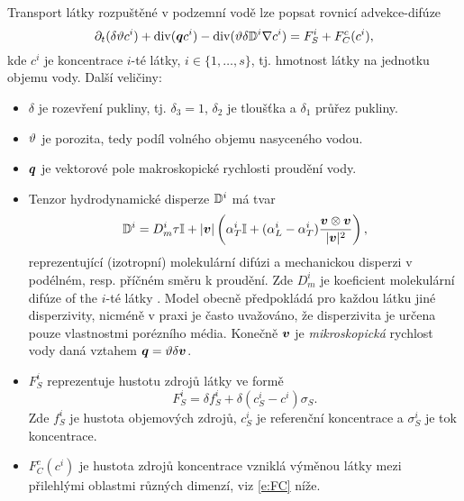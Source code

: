 Transport látky rozpuštěné v podzemní vodě lze popsat rovnicí advekce-difúze
\begin{equation}
    \label{e:ADE}
   \partial_t ( \delta \th c^i) + \div ( \vc q c^i ) - \div (\th \delta \D^i \grad c^i ) = F_S^i + F^c_C(c^i), %
\end{equation}
kde $c^i$  je koncentrace $i$-té látky, $i\in\{1,\dots, s\}$, tj. hmotnost látky na jednotku objemu vody.
Další veličiny:
\begin{itemize}
\item $\delta$  je rozevření pukliny, tj. $\delta_3=1$, $\delta_2$ je tloušťka a $\delta_1$ průřez pukliny.
\item $\vartheta$ \units{}{}{} je porozita, tedy podíl volného objemu nasyceného vodou.
\item $\mathbf{\boldsymbol{q}}$ je vektorové pole makroskopické rychlosti proudění vody.
\item Tenzor hydrodynamické disperze ${{\mathbb{D}}}^i$  má tvar
\begin{equation} 
  \label{eqn:transport_disp}
  {{\mathbb{D}}}^i =D_m^i \tau {\mathbb{I}} + \lvert\mathbf{\boldsymbol{v}}\rvert\left(\alpha_T^i {\mathbb{I}} + (\alpha_L^i - \alpha_T^i) \frac{\mathbf{\boldsymbol{v}} \otimes \mathbf{\boldsymbol{v}}}{\lvert\mathbf{\boldsymbol{v}}\rvert^2}\right),
\end{equation}
reprezentující (izotropní) molekulární difúzi a mechanickou disperzi v podélném, resp. příčném směru k proudění.
Zde $D_m^i$  je koeficient molekulární difúze of the $i$-té látky%
.
Model obecně předpokládá pro každou látku jiné disperzivity, nicméně v praxi je často uvažováno, že disperzivita je určena pouze vlastnostmi porézního média.
Konečně $\mathbf{\boldsymbol{v}}$  je \emph{mikroskopická} rychlost vody daná vztahem $\mathbf{\boldsymbol{q}} = \vartheta\delta\mathbf{\boldsymbol{v}}$.

\item $F_S^i$  reprezentuje hustotu zdrojů látky ve formě
\begin{equation}
 F_S^i = \delta f^i_S + \delta(c_S^i-c^i)\sigma_S. \label{eqn:transport_sources}
\end{equation}
Zde $f_S^i$  je hustota objemových zdrojů, $c_S^i$  je referenční koncentrace a $\sigma_S^i$  je tok koncentrace.

\item $F^c_C(c^i)$  je hustota zdrojů koncentrace vzniklá výměnou látky mezi přilehlými oblastmi různých dimenzí, viz \eqref{e:FC} níže.

\end{itemize}



